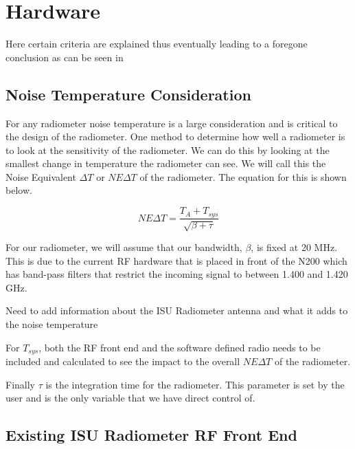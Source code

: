 \section{Hardware}

Here certain criteria are explained thus eventually
leading to a foregone conclusion as can be seen in



\subsection{Noise Temperature Consideration}

For any radiometer noise temperature is a large consideration and is critical to the design of the radiometer.  One method to determine how well a radiometer is to look at the sensitivity of the radiometer.  We can do this by looking at the smallest change in temperature the radiometer can see.  We will call this the Noise Equivalent $\Delta T$ or $NE\Delta T$ of the radiometer.  The equation for this is shown below.

\begin{equation}
NE\Delta T=\frac{T_{A}+T_{sys}}{\sqrt{\beta + \tau}}
\end{equation}

For our radiometer, we will assume that our bandwidth, $\beta$, is fixed at 20 MHz.  This is due to the current RF hardware that is placed in front of the N200 which has band-pass filters that restrict the incoming signal to between 1.400 and 1.420 GHz. 

Need to add information about the ISU Radiometer antenna and what it adds to the noise temperature

For $T_{sys}$, both the RF front end and the software defined radio needs to be included and calculated to see the impact to the overall $NE\Delta T$ of the radiometer.  

Finally $\tau$ is the integration time for the radiometer.  This parameter is set by the user and is the only variable that we have direct control of.  

\subsection{Existing ISU Radiometer RF Front End}

